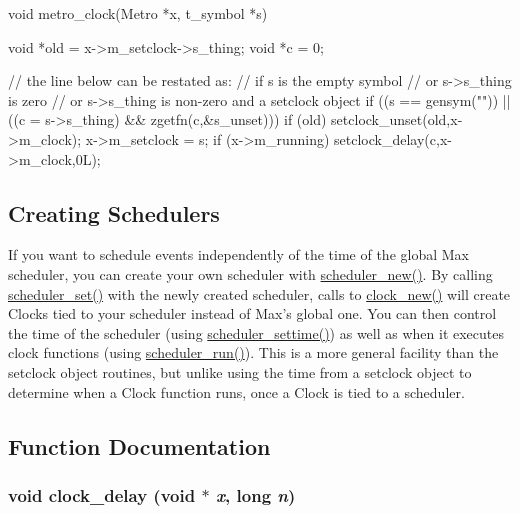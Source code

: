 \begin{DoxyCode}
    void metro_clock(Metro *x, t_symbol *s) 
    { 
        void *old = x->m_setclock->s_thing; 
        void *c = 0; 

        // the line below can be restated as: 
        //  if s is the empty symbol 
        //  or s->s_thing is zero 
        //  or s->s_thing is non-zero and a setclock object  
        if ((s == gensym("")) || ((c = s->s_thing) && zgetfn(c,&s_unset))) 
        { 
            if (old) 
                setclock_unset(old,x->m_clock); 
            x->m_setclock = s; 
            if (x->m_running) 
                setclock_delay(c,x->m_clock,0L); 
        } 
    } 
\end{DoxyCode}
\hypertarget{group__clocks_creating_schedulers}{}\subsection{Creating Schedulers}\label{group__clocks_creating_schedulers}
If you want to schedule events independently of the time of the global Max scheduler, you can create your own scheduler with \hyperlink{group__clocks_ga90e58fdc4b6aa7a1485220d808d6fc4b}{scheduler\_\-new()}. By calling \hyperlink{group__clocks_gae6fc77faa65e6f80a26f072b2b17b31b}{scheduler\_\-set()} with the newly created scheduler, calls to \hyperlink{group__clocks_ga6257ddd41904756699208f135f6539fd}{clock\_\-new()} will create Clocks tied to your scheduler instead of Max’s global one. You can then control the time of the scheduler (using \hyperlink{group__clocks_gade0e21336c4b2f33046669df0d210a48}{scheduler\_\-settime()}) as well as when it executes clock functions (using \hyperlink{group__clocks_ga69f8d9f511899d3f4b30f6b7a032849a}{scheduler\_\-run()}). This is a more general facility than the setclock object routines, but unlike using the time from a setclock object to determine when a Clock function runs, once a Clock is tied to a scheduler. 

\subsection{Function Documentation}
\hypertarget{group__clocks_ga9ac56d198904627333de740743086920}{
\subsubsection[{clock\_\-delay}]{\setlength{\rightskip}{0pt plus 5cm}void clock\_\-delay (void $\ast$ {\em x}, \/  long {\em n})}}
\label{group__clocks_ga9ac56d198904627333de740743086920}


